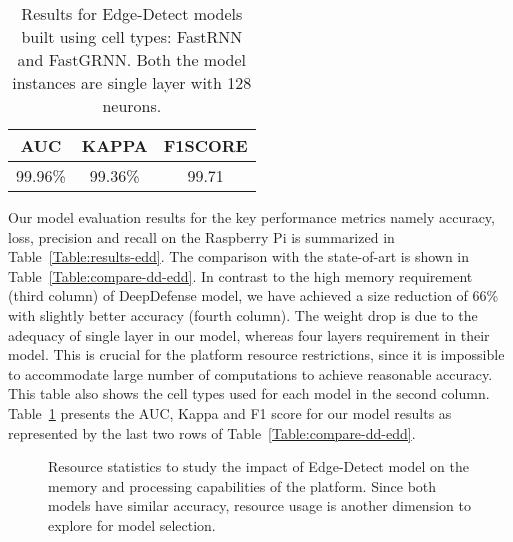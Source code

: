 \documentclass[conference]{IEEEtran}
\begin{document}
\begin{table}[]
\caption{Results for Edge-Detect models built using cell types: FastRNN and FastGRNN. Both the model instances are single layer with 128 neurons. }
    \label{Table:compare-edd}
    \centering
\begin{tabular}{|c|c|c|}
\hline
\textbf{AUC}   & \textbf{KAPPA}  & \textbf{F1SCORE}  \\
\hline
99.96\% & 99.36\%  & 99.71 \\
\hline
\end{tabular}
\end{table}







Our model evaluation results for the key performance metrics namely accuracy, loss, precision and recall on the Raspberry Pi is summarized in Table~\ref{Table:results-edd}. The comparison with the state-of-art is shown in Table~\ref{Table:compare-dd-edd}.
In contrast to the high memory requirement (third column) of DeepDefense model, we have achieved a size reduction of 66\% with slightly better accuracy (fourth column). 
The weight drop is due to the adequacy of single layer in our model, whereas four layers requirement in their model. 
This is crucial for the platform resource restrictions, since it is impossible to accommodate large number of computations to achieve reasonable accuracy. 
This table also shows the cell types used for each model in the second column.
Table~\ref{Table:compare-edd} presents the AUC, Kappa and F1 score for our model results as represented by the last two rows of Table~\ref{Table:compare-dd-edd}. 
\newline


\begin{figure}
    \centering
     

    \caption{Resource statistics to study the impact of Edge-Detect model on the memory and processing capabilities of the platform. Since both models have similar accuracy, resource usage is another dimension to explore for model selection.}
    \label{fig:pi_stats}
\end{figure}
\end{document}
